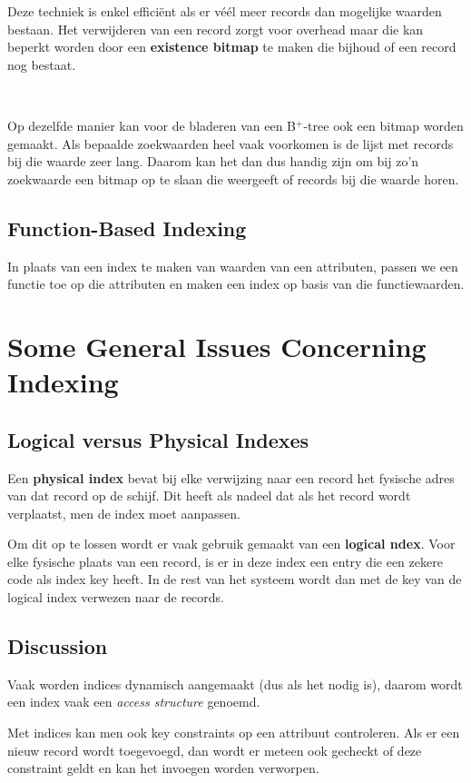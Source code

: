 Deze techniek is enkel effici\"ent als er v\'e\'el meer records dan mogelijke waarden bestaan. Het verwijderen van een record zorgt voor overhead maar die kan beperkt worden door een \textbf{existence bitmap} te maken die bijhoud of een record nog bestaat.

~

\noindent Op dezelfde manier kan voor de bladeren van een B$^+$-tree ook een bitmap worden gemaakt. Als bepaalde zoekwaarden heel vaak voorkomen is de lijst met records bij die waarde zeer lang. Daarom kan het dan dus handig zijn om bij zo'n zoekwaarde een bitmap op te slaan die weergeeft of records bij die waarde horen.


\subsection{Function-Based Indexing}
In plaats van een index te maken van waarden van een attributen, passen we een functie toe op die attributen en maken een index op basis van die functiewaarden.



\section{Some General Issues Concerning Indexing}
\subsection{Logical versus Physical Indexes}
Een \textbf{physical index} bevat bij elke verwijzing naar een record het fysische adres van dat record op de schijf. Dit heeft als nadeel dat als het record wordt verplaatst, men de index moet aanpassen.

Om dit op te lossen wordt er vaak gebruik gemaakt van een \textbf{logical ndex}. Voor elke fysische plaats van een record, is er in deze index een entry die een zekere code als index key heeft. In de rest van het systeem wordt dan met de key van de logical index verwezen naar de records. 


\subsection{Discussion}
Vaak worden indices dynamisch aangemaakt (dus als het nodig is), daarom wordt een index vaak een \textit{access structure} genoemd.

Met indices kan men ook key constraints op een attribuut controleren. Als er een nieuw record wordt toegevoegd, dan wordt er meteen ook gecheckt of deze constraint geldt en kan het invoegen worden verworpen.

